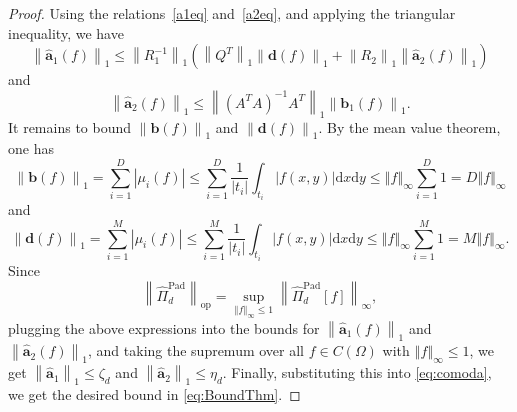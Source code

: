 \documentclass{svjour3}
\newcommand{\de}{\mathrm{d}}
\renewcommand{\de}{\mathrm{d}} %
\begin{document}
\begin{proof}
Using the relations~\eqref{a1eq} and~\eqref{a2eq}, and applying the triangular inequality, we have
\begin{equation*}
    \left\lVert \hat{\boldsymbol{a}}_1 (f) \right\rVert_1\le \left\lVert R_{1}^{-1}\right\rVert_{1} \left(\left\lVert Q^T \right\rVert_1 \left\lVert \boldsymbol{d} (f) \right\rVert_1 + \left\lVert R_{2}\right\rVert_1 \left\lVert \hat{\boldsymbol{a}}_2 (f)\right\rVert_1\right) 
\end{equation*}
and
\begin{equation*}\label{a2}
   \left\lVert \hat{\boldsymbol{a}}_2 (f)\right\rVert_1\le\left\lVert\left(A^{T}A\right)^{-1}A^{T}\right\rVert_1 \left\lVert \boldsymbol{b}_1 (f) \right\rVert_1.
\end{equation*}
It remains to bound $\left\lVert \boldsymbol{b} (f) \right\rVert_1$ and $\left\lVert \boldsymbol{d} (f) \right\rVert_1$. By the mean value theorem, %
one has
\begin{equation*}\label{aus1}
    \left\lVert \boldsymbol{b} (f) \right\rVert_1=\sum_{i=1}^D \left\lvert \mu_i(f)\right\rvert\le\sum_{i=1} ^D \frac{1}{|t_i|}\int_{t_i}\left\lvert f(x,y)\right\rvert \de x \de y \le \left\Vert f \right\Vert_\infty \sum_{i=1} ^D 1 = D \left\Vert f \right\Vert_\infty
\end{equation*}
and 
\begin{equation*}
\left\lVert \boldsymbol{d} (f) \right\rVert_1=\sum_{i=1}^{M} \left\lvert \mu_i(f)\right\rvert\le \sum_{i=1}^M \frac{1}{|t_i|} \int_{t_i}\left\lvert f(x,y)\right\rvert \de x \de y \le \left\Vert f \right\Vert_\infty \sum_{i=1} ^{M} 1 = M \left\Vert f \right\Vert_\infty.
\end{equation*}
Since
\begin{equation*}
    \left\lVert \hat{\Pi}_d^{\mathrm{Pad}} \right\rVert_{\mathrm{op}} = \sup_{\left\Vert f \right\Vert_\infty \leq 1} \left\lVert \hat{\Pi}_d^{\mathrm{Pad}} [f] \right\rVert_\infty, 
\end{equation*}
plugging the above expressions into the bounds for $ \left\lVert \hat{\boldsymbol{a}}_1 (f) \right\rVert_1 $ and $ \left\lVert \hat{\boldsymbol{a}}_2 (f) \right\rVert_1 $, and taking the supremum over all $f \in C(\Omega)$ with $ \left\Vert f \right\Vert_\infty \leq 1 $, we get $ \left\lVert \hat{\boldsymbol{a}}_1 \right\rVert_1 \leq \zeta_d $ and $ \left\lVert \hat{\boldsymbol{a}}_2\right\rVert_1 \leq \eta_d $. Finally, substituting this into \eqref{eq:comoda}, we get the desired bound in \eqref{eq:BoundThm}.
\end{proof}
\end{document}
